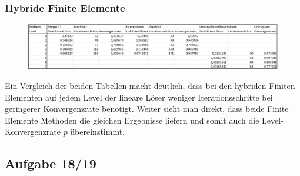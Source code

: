 \subsubsection{Hybride Finite Elemente}
\begin{figure}[H]
	\centering
	\includegraphics[width=\textwidth]{../../19/tabelle1hybrid.png} 
\end{figure}

Ein Vergleich der beiden Tabellen macht deutlich, dass bei den hybriden Finiten Elementen auf jedem Level der lineare Löser weniger Iterationsschritte bei geringerer Konvergenzrate benötigt. Weiter sieht man direkt, dass beide Finite Elemente Methoden die gleichen Ergebnisse liefern und somit auch die Level-Konvergenzrate $p$ übereinstimmt.


\subsection{Aufgabe 18/19}
